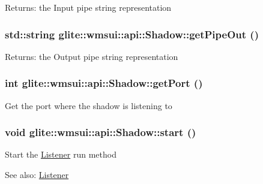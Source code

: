 \begin{Desc}
\item[Returns:]the Input pipe string representation \end{Desc}
\hypertarget{classglite_1_1wmsui_1_1api_1_1Shadow_a6}{
\subsubsection[getPipeOut]{\setlength{\rightskip}{0pt plus 5cm}std::string glite::wmsui::api::Shadow::get\-Pipe\-Out ()}}
\label{classglite_1_1wmsui_1_1api_1_1Shadow_a6}


\begin{Desc}
\item[Returns:]the Output pipe string representation \end{Desc}
\hypertarget{classglite_1_1wmsui_1_1api_1_1Shadow_a7}{
\subsubsection[getPort]{\setlength{\rightskip}{0pt plus 5cm}int glite::wmsui::api::Shadow::get\-Port ()}}
\label{classglite_1_1wmsui_1_1api_1_1Shadow_a7}


Get the port where the shadow is listening to \hypertarget{classglite_1_1wmsui_1_1api_1_1Shadow_a3}{
\subsubsection[start]{\setlength{\rightskip}{0pt plus 5cm}void glite::wmsui::api::Shadow::start ()}}
\label{classglite_1_1wmsui_1_1api_1_1Shadow_a3}


Start the \hyperlink{classglite_1_1wmsui_1_1api_1_1Listener}{Listener} run method \begin{Desc}
\item[See also:]\hyperlink{classglite_1_1wmsui_1_1api_1_1Listener}{Listener}\end{Desc}


